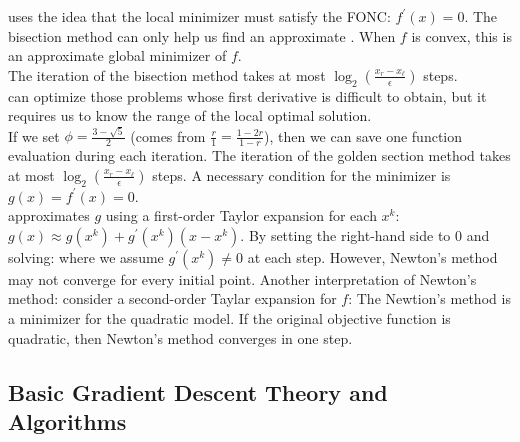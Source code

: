 \documentclass[10pt]{report}
\begin{document}
 uses the idea that the local minimizer must satisfy the FONC: $f^{\prime}(x)=0.$
The bisection method can only help us find an approximate . When $f$ is convex, this is an approximate global minimizer of $f$.\\
The iteration of the bisection method takes at most $\log_2(\frac{x_r-x_\ell}\epsilon)$ steps.\\
 can optimize those problems whose first derivative is difficult to obtain, but it requires us to know the range of the local optimal solution.\\
If we set $\phi=\frac{3-\sqrt{5}}2$ (comes from $\frac{r}{1}=\frac{1-2r}{1-r}$), then we can save one function evaluation during each iteration.
The iteration of the golden section method takes at most $\log_2(\frac{x_r-x_\ell}\epsilon)$ steps. A necessary condition for the minimizer is $g(x)=f^\prime(x)=0$. \\
 approximates $g$ using a first-order
Taylor expansion for each $x^k$: $g(x)\approx g(x^k)+g^{\prime}(x^k)(x-x^k).$ By setting the right-hand side to 0 and solving:
where we assume $g^\prime(x^k)\ne0$ at each step. However, Newton's method may not converge for every initial point.
Another interpretation of Newton's method: consider a second-order Taylar expansion for $f$:
The Newtion's method is a minimizer for the quadratic model. If the original objective function is quadratic, then Newton's method converges in one step.

\subsection{Basic Gradient Descent Theory and Algorithms}
\end{document}
